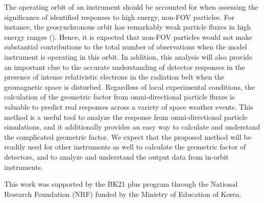 \documentclass{jkas}
\begin{document}
The operating orbit of an instrument should be accounted for when assessing the significance of identified responses to high energy, non-FOV particles. For instance, the geosynchronous orbit has remarkably weak particle fluxes in high energy ranges (\citealt{nagatsuma2017}). Hence, it is expected that non-FOV particles would not make substantial contributions to the total number of observations when the model instrument is operating in this orbit. In addition, this analysis will also provide an important clue to the accurate understanding of detector responses in the presence of intense relativistic electrons in the radiation belt when the geomagnetic space is disturbed. Regardless of local experimental conditions, the calculation of the geometric factor from omni-directional particle fluxes is valuable to predict real responses across a variety of space weather events. This method is a useful tool to analyze the response from omni-directional particle simulations, and it additionally provides an easy way to calculate and understand the complicated geometric factor. We expect that the proposed method will be readily used for other instruments as well to calculate the geometric factor of detectors, and to analyze and understand the output data from in-orbit instruments.



\acknowledgments

This work was supported by the BK21 plus program through the National Research Foundation (NRF) funded by the Ministry of Education of Korea.




\end{document}
